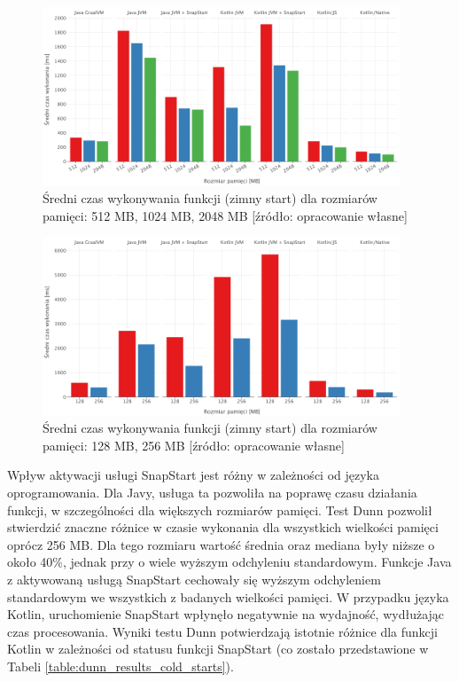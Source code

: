 \begin{figure}[h]
    \centering
    \includegraphics[width=0.95\textwidth]{charts/results/avg-cold-start-512-2048.png}
    \caption{Średni czas wykonywania funkcji (zimny start) dla rozmiarów pamięci: 512 MB, 1024 MB, 2048 MB  [źródło: opracowanie własne]}
    \label{fig:avg_cold_start_512_2045}
\end{figure}

\begin{figure}[h]
    \centering
    \includegraphics[width=0.95\textwidth]{charts/results/avg-cold-start-128-256.png}
    \caption{Średni czas wykonywania funkcji (zimny start) dla rozmiarów pamięci: 128 MB, 256 MB  [źródło: opracowanie własne]}
    \label{fig:avg_cold_start_128_256}
\end{figure}

\newpage

Wpływ aktywacji usługi SnapStart jest różny w zależności od języka oprogramowania.
Dla Javy, usługa ta pozwoliła na poprawę czasu działania funkcji, w szczególności dla większych rozmiarów pamięci.
Test Dunn pozwolił stwierdzić znaczne różnice w czasie wykonania dla wszystkich wielkości pamięci oprócz 256 MB.
Dla tego rozmiaru wartość średnia oraz mediana były niższe o około 40\%, jednak przy o wiele wyższym odchyleniu standardowym.
Funkcje Java z aktywowaną usługą SnapStart cechowały się wyższym odchyleniem standardowym we wszystkich z badanych wielkości pamięci.
W przypadku języka Kotlin, uruchomienie SnapStart wpłynęło negatywnie na wydajność, wydłużając czas procesowania.
Wyniki testu Dunn potwierdzają istotnie różnice dla funkcji Kotlin w zależności od statusu funkcji SnapStart (co zostało przedstawione w Tabeli \ref{table:dunn_results_cold_starts}).

